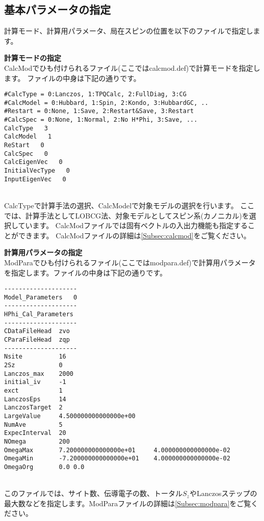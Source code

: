 \subsection{基本パラメータの指定}
計算モード、計算用パラメータ、局在スピンの位置を以下のファイルで指定します。
\begin{description}
\item {\bf 計算モードの指定}\\
  CalcModでひも付けられるファイル(ここではcalcmod.def)で計算モードを指定します。
  ファイルの中身は下記の通りです。\\
\begin{minipage}{15cm}
\begin{screen}
\begin{verbatim}
#CalcType = 0:Lanczos, 1:TPQCalc, 2:FullDiag, 3:CG
#CalcModel = 0:Hubbard, 1:Spin, 2:Kondo, 3:HubbardGC, ..
#Restart = 0:None, 1:Save, 2:Restart&Save, 3:Restart
#CalcSpec = 0:None, 1:Normal, 2:No H*Phi, 3:Save, ...
CalcType   3
CalcModel   1
ReStart   0
CalcSpec   0
CalcEigenVec   0
InitialVecType   0
InputEigenVec   0
\end{verbatim}
\end{screen}
\end{minipage}
~\\
CalcTypeで計算手法の選択、CalcModelで対象モデルの選択を行います。
ここでは、計算手法としてLOBCG法、対象モデルとしてスピン系(カノニカル)を選択しています。
{CalcModファイルでは固有ベクトルの入出力機能も指定することができます。}
CalcModファイルの詳細は\ref{Subsec:calcmod}をご覧ください。\\

\item {\bf 計算用パラメータの指定}\\
ModParaでひも付けられるファイル(ここではmodpara.def)で計算用パラメータを指定します。ファイルの中身は下記の通りです。\\
\begin{minipage}{15cm}
\begin{screen}
\begin{verbatim}
--------------------
Model_Parameters   0
--------------------
HPhi_Cal_Parameters
--------------------
CDataFileHead  zvo
CParaFileHead  zqp
--------------------
Nsite          16   
2Sz            0    
Lanczos_max    2000 
initial_iv     -1   
exct           1    
LanczosEps     14   
LanczosTarget  2    
LargeValue     4.500000000000000e+00    
NumAve         5    
ExpecInterval  20   
NOmega         200  
OmegaMax       7.200000000000000e+01     4.000000000000000e-02    
OmegaMin       -7.200000000000000e+01    4.000000000000000e-02    
OmegaOrg       0.0 0.0
\end{verbatim}
\end{screen}
\end{minipage}
~\\
このファイルでは、サイト数、{伝導電子の数、トータル$S_z$}やLanczosステップの最大数などを指定します。ModParaファイルの詳細は\ref{Subsec:modpara}をご覧ください。\\


\end{description}
